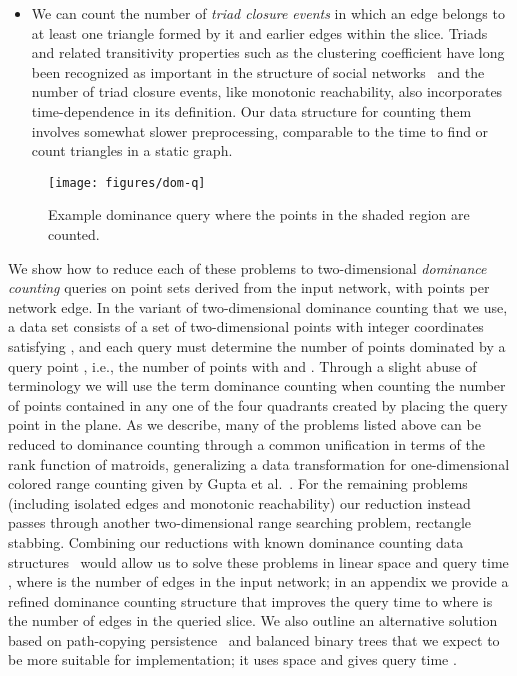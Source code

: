\documentclass[11pt]{article}
\begin{document}
\begin{itemize}
\item We can count the number of \emph{triad closure events} in which an edge belongs to at least one triangle formed by it and earlier edges within the slice. Triads and related transitivity properties such as the clustering coefficient have long been recognized as important in the structure of social networks~\cite{Gra-AJS-73,Rap-BMB-53} and the number of triad closure events, like monotonic reachability,  also incorporates time-dependence in its definition. Our data structure for counting them involves somewhat slower preprocessing, comparable to the time to find or count triangles in a static graph.
\end{itemize}

\begin{wrapfigure}[14]{r}{0.28\textwidth}
\vspace{-1.5em}
\centering
\texttt{[image: figures/dom-q]}
\vspace{-2em}
\caption{Example dominance query where the points in the shaded region are counted.}
\label{fig:dom-q}
\vspace{-0em}
\end{wrapfigure}
We show how to reduce each of these problems to two-dimensional \emph{dominance counting} queries on point sets derived from the input network, with  points per network edge. In the variant of two-dimensional dominance counting that we use, a data set consists of a set of  two-dimensional points with integer coordinates  satisfying , and each query must determine the number of points dominated by a query point , i.e., the number of points  with  and . Through a slight abuse of terminology we will use the term dominance counting when counting the number of points contained in any one of the four quadrants created by placing the query point  in the plane.  As we describe, many of the problems listed above can be reduced to dominance counting through a common unification in terms of the rank function of matroids,  generalizing a data transformation for one-dimensional colored range counting given by Gupta et al.~\cite{ColorRangeQueries}.
For the remaining problems (including isolated edges and monotonic reachability) our reduction instead passes through another two-dimensional range searching problem, rectangle stabbing. Combining our reductions with known dominance counting data structures~\cite{JaJMorShi-ISAAC-04} would allow us to solve these problems in linear space and query time , where  is the number of edges in the input network; in an appendix we provide a refined dominance counting structure that improves the query time to  where  is the number of edges in the queried slice. We also outline an alternative solution based on path-copying persistence~\cite{DSPersistent} and balanced binary trees that we expect to be more suitable for implementation; it uses  space and gives query time .
\end{document}

